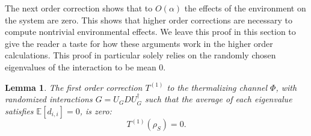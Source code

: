 \documentclass{article}
\newtheorem{lemma}[theorem]{Lemma}
\begin{document}
The next order correction shows that to $O(\alpha)$ the effects of the environment on the system are zero. This shows that higher order corrections are necessary to compute nontrivial environmental effects. We leave this proof in this section to give the reader a taste for how these arguments work in the higher order calculations. This proof in particular solely relies on the randomly chosen eigenvalues of the interaction to be mean 0.
\begin{lemma}
   The first order correction $T^{(1)}$ to the thermalizing channel $\Phi$, with randomized interactions $G = U_G D U_G^\dagger $ such that the average of each eigenvalue satisfies $\mathbb{E}[d_{i,i}] = 0$, is zero:
   \begin{equation}
        T^{(1)}(\rho_S) = 0.
   \end{equation}
\end{lemma}
\end{document}
